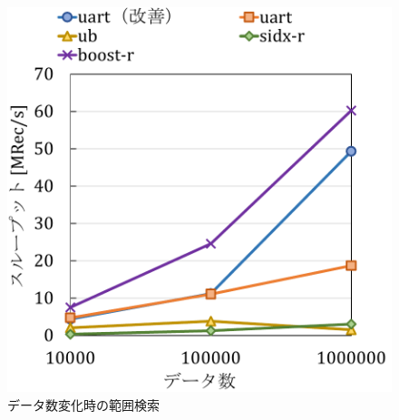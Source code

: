\begin{figure}[tb]
\begin{minipage}[c]{0.495\textwidth}
    \includegraphics[scale=0.5]{./figures/graph-scan-datasize.pdf}
    \caption{データ数変化時の範囲検索}
    \label{graph:rec-sc}
  \end{minipage}
\end{figure}
